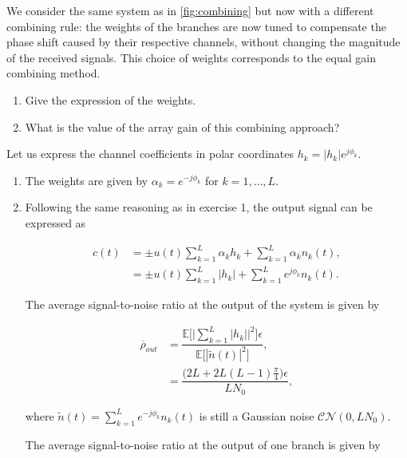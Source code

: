 \documentclass [a4paper, 11pt] {article}
\begin{document}
    \begin{exercise}{2}
    We consider the same system as in \autoref{fig:combining} but now with a different combining rule: the weights of the branches are now tuned to compensate the phase shift caused by their respective channels, without changing the magnitude of the received signals. This choice of weights corresponds to the equal gain combining method.
\begin{enumerate}
\item Give the expression of the weights.
\item What is the value of the array gain of this combining approach?
\end{enumerate}
    \end{exercise}

    \begin{solution}

              Let us express the channel coefficients in polar coordinates $h_k = |h_k|e^{j\phi_k}$.

\begin{enumerate}
    \item The weights are given by $\alpha_k = e^{-j\phi_k}$ for $k=1,\hdots,L$.
    \item Following the same reasoning as in exercise 1, the output signal can be expressed as

    \begin{align}
        c(t) &= \pm u(t) \sum_{k=1}^{L}\alpha_kh_k + \sum_{k=1}^{L}\alpha_k n_k(t), \\
        &= \pm u(t) \sum_{k=1}^{L} |h_k| + \sum_{k=1}^{L} e^{j\phi_k} n_k(t).
    \end{align}

    The average signal-to-noise ratio at the output of the system is given by

    \begin{align}
        \overline{\rho}_{out} &= \dfrac{\mathbb{E}\bigg[ \Big| \sum_{k=1}^{L} |h_k| \Big|^2 \bigg] \epsilon}{\mathbb{E}\Big[ |\tilde{n}(t)|^2\Big]},\\
        &= \dfrac{\Big(2L+2L(L-1)\frac{\pi}{4}\Big) \epsilon}{LN_0},
    \end{align}

    where $\tilde{n}(t) = \sum_{k=1}^{L} e^{-j\phi_k}n_k(t)$ is still a Gaussian noise $\mathcal{C}\mathcal{N}(0,LN_0)$.

    The average signal-to-noise ratio at the output of one branch is given by


\end{enumerate}
\end{solution}
\end{document}
